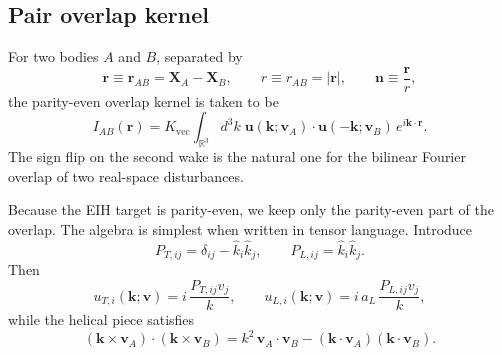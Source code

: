 \documentclass[11pt]{article}
\newcommand{\vct}{\mathbf v}
\newcommand{\nvec}{\mathbf n}
\newcommand{\Kvec}{K_{\mathrm{vec}}}
\begin{document}
\subsection{Pair overlap kernel}
\label{app:wake-overlap}

For two bodies \(A\) and \(B\), separated by
\begin{equation}
\mathbf r\equiv \mathbf r_{AB}=\mathbf X_A-\mathbf X_B,
\qquad
r\equiv r_{AB}=|\mathbf r|,
\qquad
\nvec\equiv \frac{\mathbf r}{r},
\label{eq:app-wake-r}
\end{equation}
the parity-even overlap kernel is taken to be
\begin{equation}
I_{AB}(\mathbf r)
=
\Kvec
\int_{\mathbb R^3} d^3k\;
\mathbf u(\mathbf k;\vct_A)\!\cdot\!\mathbf u(-\mathbf k;\vct_B)\,
e^{i\mathbf k\cdot\mathbf r}.
\label{eq:app-overlap-kernel}
\end{equation}
The sign flip on the second wake is the natural one for the bilinear Fourier overlap of
two real-space disturbances.

Because the EIH target is parity-even, we keep only the parity-even part of the overlap.
The algebra is simplest when written in tensor language. Introduce
\begin{equation}
P_{T,ij}=\delta_{ij}-\hat k_i\hat k_j,
\qquad
P_{L,ij}=\hat k_i\hat k_j.
\label{eq:app-projector-tensors}
\end{equation}
Then
\begin{equation}
u_{T,i}(\mathbf k;\vct)= i\,\frac{P_{T,ij}v_j}{k},
\qquad
u_{L,i}(\mathbf k;\vct)= i\,a_L\,\frac{P_{L,ij}v_j}{k},
\label{eq:app-uT-uL-tensor}
\end{equation}
while the helical piece satisfies
\begin{equation}
(\mathbf k\times\vct_A)\!\cdot\!(\mathbf k\times\vct_B)
=
k^2\,\vct_A\!\cdot\!\vct_B
-
(\mathbf k\!\cdot\!\vct_A)(\mathbf k\!\cdot\!\vct_B).
\label{eq:app-cross-identity}
\end{equation}
\end{document}
